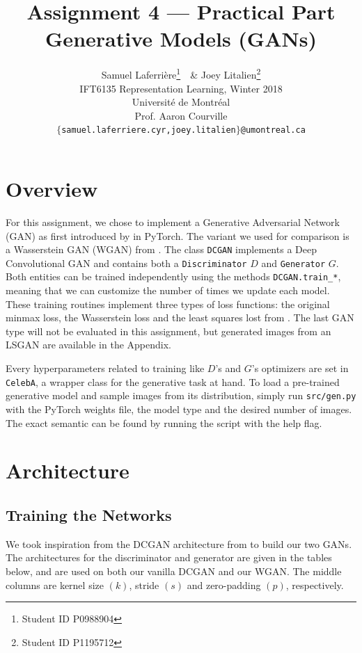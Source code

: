 \documentclass[table]{article}
\title{Assignment 4 --- Practical Part \\
Generative Models (GANs)}
\author{Samuel Laferri\`ere\thanks{Student ID P0988904}\ \, \& Joey Litalien\thanks{Student ID P1195712} \\
IFT6135 Representation Learning, Winter 2018\\
Universit\'e de Montr\'eal\\
Prof. Aaron Courville \\
\texttt{$\{$samuel.laferriere.cyr,joey.litalien$\}$@umontreal.ca}}
\def\*#1{\mathbf{#1}}
\newcommand{\code}[1]{{\color{Blue}\small\texttt{#1}}}
\begin{document}
\maketitle
\thispagestyle{empty}

\section{Overview}

For this assignment, we chose to implement a Generative Adversarial Network (GAN) as first introduced by \cite{gan} in PyTorch. The variant we used for comparison is a Wasserstein GAN (WGAN) from \cite{wgan}. The class \code{DCGAN} implements a Deep Convolutional GAN and contains both a \code{Discriminator} $D$ and \code{Generator} $G$. Both entities can be trained independently using the methods \code{DCGAN.train\_*}, meaning that we can customize the number of times we update each model. These training routines implement three types of loss functions: the original minmax loss, the Wasserstein loss and the least squares lost from \cite{lsgan}. The last GAN type will not be evaluated in this assignment, but generated images from an LSGAN are available in the Appendix.

Every hyperparameters related to training like $D$'s and $G$'s optimizers are set in \code{CelebA}, a wrapper class for the generative task at hand. To load a pre-trained generative model and sample images from its distribution, simply run \code{src/gen.py} with the PyTorch weights file, the model type and the desired number of images. The exact semantic can be found by running the script with the help flag.


\section{Architecture}
\subsection{Training the Networks}

We took inspiration from the DCGAN architecture from \cite{dcgan} to build our two GANs. The architectures for the discriminator and generator are given in the tables below, and are used on both our vanilla DCGAN and our WGAN. The middle columns are kernel size $(k)$, stride $(s)$ and zero-padding $(p)$, respectively.
\end{document}
